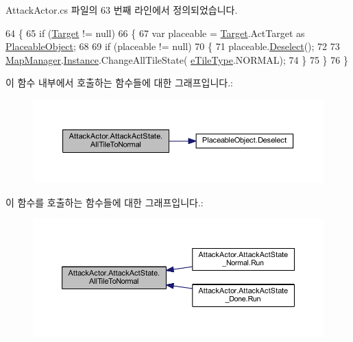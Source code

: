 Attack\+Actor.\+cs 파일의 63 번째 라인에서 정의되었습니다.


\begin{DoxyCode}
64         \{
65             \textcolor{keywordflow}{if} (\hyperlink{class_m_c_n_1_1_state_a93ba2fd920292031bd6e65b1dc505cb3}{Target} != null)
66             \{
67                 var placeable = \hyperlink{class_m_c_n_1_1_state_a93ba2fd920292031bd6e65b1dc505cb3}{Target}.ActTarget as \hyperlink{class_placeable_object}{PlaceableObject};
68 
69                 \textcolor{keywordflow}{if} (placeable != null)
70                 \{
71                     placeable.\hyperlink{class_placeable_object_a0c1248b1f9981ddbf68e6f70a6498f3d}{Deselect}();
72 
73                     \hyperlink{class_map_manager}{MapManager}.\hyperlink{class_m_c_n_1_1_mono_singletone_aa50c027cca64cf4ad30c1ee5c83e0b78}{Instance}.ChangeAllTileState(
      \hyperlink{_tile_8cs_a271bc07be325bca511bcb747e0ff2fda}{eTileType}.NORMAL);
74                 \}
75             \}
76         \}
\end{DoxyCode}


이 함수 내부에서 호출하는 함수들에 대한 그래프입니다.\+:
\nopagebreak
\begin{figure}[H]
\begin{center}
\leavevmode
\includegraphics[width=350pt]{class_attack_actor_1_1_attack_act_state_a993762ec959af926e416f03fa7b71203_cgraph}
\end{center}
\end{figure}




이 함수를 호출하는 함수들에 대한 그래프입니다.\+:
\nopagebreak
\begin{figure}[H]
\begin{center}
\leavevmode
\includegraphics[width=350pt]{class_attack_actor_1_1_attack_act_state_a993762ec959af926e416f03fa7b71203_icgraph}
\end{center}
\end{figure}


